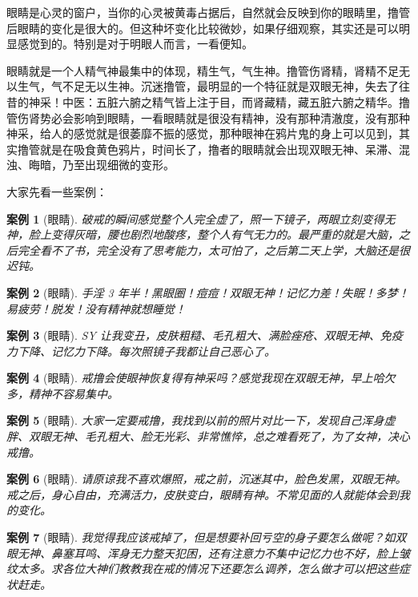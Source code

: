 \documentclass{ctexart}
\newtheorem{case}{案例}
\begin{document}
眼睛是心灵的窗户，当你的心灵被黄毒占据后，自然就会反映到你的眼睛里，撸管后眼睛的变化是很大的。但这种坏变化比较微妙，如果仔细观察，其实还是可以明显感觉到的。特别是对于明眼人而言，一看便知。

眼睛就是一个人精气神最集中的体现，精生气，气生神。撸管伤肾精，肾精不足无以生气，气不足无以生神。沉迷撸管，最明显的一个特征就是双眼无神，失去了往昔的神采！中医：五脏六腑之精气皆上注于目，而肾藏精，藏五脏六腑之精华。撸管伤肾势必会影响到眼睛，一看眼睛就是很没有精神，没有那种清澈度，没有那种神采，给人的感觉就是很萎靡不振的感觉，那种眼神在鸦片鬼的身上可以见到，其实撸管就是在吸食黄色鸦片，时间长了，撸者的眼睛就会出现双眼无神、呆滞、混浊、晦暗，乃至出现细微的变形。

大家先看一些案例：

\begin{case}[眼睛]
    破戒的瞬间感觉整个人完全虚了，照一下镜子，两眼立刻变得无神，脸上变得灰暗，腰也剧烈地酸疼，整个人有气无力的。最严重的就是大脑，之后完全看不了书，完全没有了思考能力，太可怕了，之后第二天上学，大脑还是很迟钝。
\end{case}

\begin{case}[眼睛]
    手淫 3 年半！黑眼圈！痘痘！双眼无神！记忆力差！失眠！多梦！易疲劳！脱发！没有精神就想睡觉！
\end{case}

\begin{case}[眼睛]
    SY 让我变丑，皮肤粗糙、毛孔粗大、满脸痤疮、双眼无神、免疫力下降、记忆力下降。每次照镜子我都让自己恶心了。
\end{case}

\begin{case}[眼睛]
    戒撸会使眼神恢复得有神采吗？感觉我现在双眼无神，早上哈欠多，精神不容易集中。
\end{case}

\begin{case}[眼睛]
    大家一定要戒撸，我找到以前的照片对比一下，发现自己浑身虚胖、双眼无神、毛孔粗大、脸无光彩、非常憔悴，总之难看死了，为了女神，决心戒撸。
\end{case}

\begin{case}[眼睛]
    请原谅我不喜欢爆照，戒之前，沉迷其中，脸色发黑，双眼无神。戒之后，身心自由，充满活力，皮肤变白，眼睛有神。不常见面的人就能体会到我的变化。
\end{case}

\begin{case}[眼睛]
    我觉得我应该戒掉了，但是想要补回亏空的身子要怎么做呢？如双眼无神、鼻塞耳鸣、浑身无力整天犯困，还有注意力不集中记忆力也不好，脸上皱纹太多。求各位大神们教教我在戒的情况下还要怎么调养，怎么做才可以把这些症状赶走。
\end{case}
\end{document}

